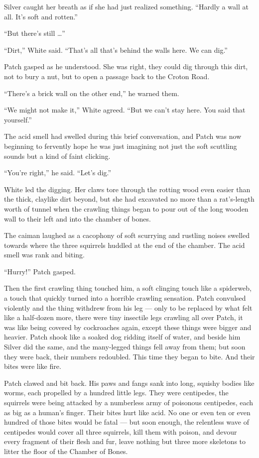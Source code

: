 \documentclass[ebook,oneside,openany,12pt]{memoir}
\begin{document}
Silver caught her breath as if she had just realized
something. “Hardly a wall at all. It’s soft and rotten.”

“But there’s still …”

“Dirt,” White said. “That’s all that’s behind the walls here. We can
dig.”

Patch gasped as he understood. She was right, they could dig through
this dirt, not to bury a nut, but to open a passage back to the Croton
Road.

“There’s a brick wall on the other end,” he warned them.

“We might not make it,” White agreed. “But we can’t stay here. You
said that yourself.”

The acid smell had swelled during this brief conversation, and Patch
was now beginning to fervently hope he was just imagining not just the
soft scuttling sounds but a kind of faint clicking.

“You’re right,” he said. “Let’s dig.”

White led the digging. Her claws tore through the rotting wood even
easier than the thick, claylike dirt beyond, but she had excavated no
more than a rat’s-length worth of tunnel when the crawling things
began to pour out of the long wooden wall to their left and into the
chamber of bones.

The caiman laughed as a cacophony of soft scurrying and rustling
noises swelled towards where the three squirrels huddled at the end of
the chamber. The acid smell was rank and biting.

“Hurry!” Patch gasped.

Then the first crawling thing touched him, a soft clinging touch like
a spiderweb, a touch that quickly turned into a horrible crawling
sensation. Patch convulsed violently and the thing withdrew from his
leg — only to be replaced by what felt like a half-dozen more, there
were tiny insectile legs crawling all over Patch, it was like being
covered by cockroaches again, except these things were bigger and
heavier. Patch shook like a soaked dog ridding itself of water, and
beside him Silver did the same, and the many-legged things fell away
from them; but soon they were back, their numbers redoubled. This time
they began to bite. And their bites were like fire.

Patch clawed and bit back. His paws and fangs sank into long, squishy
bodies like worms, each propelled by a hundred little legs. They were
centipedes, the squirrels were being attacked by a numberless army of
poisonous centipedes, each as big as a human’s finger. Their bites
hurt like acid. No one or even ten or even hundred of those bites
would be fatal — but soon enough, the relentless wave of centipedes
would cover all three squirrels, kill them with poison, and devour
every fragment of their flesh and fur, leave nothing but three more
skeletons to litter the floor of the Chamber of Bones.
\end{document}
